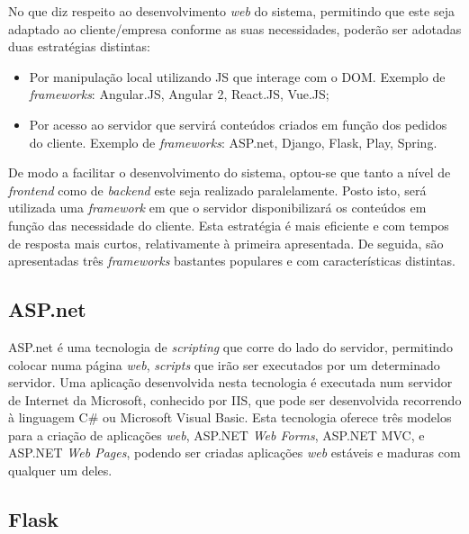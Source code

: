 No que diz respeito ao desenvolvimento \textit{web} do sistema, permitindo que este seja adaptado ao cliente/empresa conforme as suas necessidades, poderão ser adotadas duas estratégias distintas: 

\begin{itemize}
	\item Por manipulação local utilizando \ac{JS} que interage com o \ac{DOM}. Exemplo de \textit{frameworks}: Angular.JS, Angular 2, React.JS, Vue.JS; 
	
	\item Por acesso ao servidor que servirá conteúdos criados em função dos pedidos do cliente. Exemplo de \textit{frameworks}: ASP.net, Django, Flask, Play, Spring. 
	
\end{itemize}


De modo a facilitar o desenvolvimento do sistema, optou-se que tanto  a nível de \textit{frontend} como de \textit{backend} este seja realizado paralelamente. Posto isto, será utilizada uma \textit{framework} em que o servidor disponibilizará os conteúdos em função das necessidade do cliente. Esta estratégia é mais eficiente e com tempos de resposta mais curtos, relativamente à primeira apresentada. De seguida, são apresentadas três \textit{frameworks} bastantes populares e com características distintas. 




\subsection{ASP.net}


ASP.net é uma tecnologia de \textit{scripting} que corre do lado do servidor, permitindo colocar numa página \textit{web}, \textit{scripts} que irão ser executados por um determinado servidor. Uma aplicação desenvolvida nesta tecnologia é executada num servidor de Internet da Microsoft, conhecido por \ac{IIS}, que pode ser desenvolvida recorrendo à linguagem C\# ou Microsoft Visual Basic. Esta tecnologia oferece três modelos para a criação de aplicações \textit{web}, ASP.NET \textit{Web Forms}, ASP.NET \ac{MVC}, e ASP.NET \textit{Web Pages}, podendo ser criadas aplicações \textit{web} estáveis e maduras com qualquer um deles\cite{Microsoft2016}. 


\subsection{Flask}


